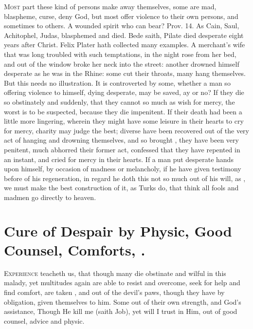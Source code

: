 {\lettrine{M}{ost} part these kind of persons make away themselves, some are
mad, blaspheme, curse, deny God, but most offer violence to their own
persons, and sometimes to others. A wounded spirit who can bear? Prov.
 14. As Cain, Saul, Achitophel, Judas, blasphemed and died. Bede
saith, Pilate died desperate eight years after Christ. Felix
Plater hath collected many examples. A merchant's wife that was
long troubled with such temptations, in the night rose from her bed,
and out of the window broke her neck into the street: another drowned
himself desperate as he was in the Rhine: some cut their throats, many
hang themselves. But this needs no illustration. It is controverted by
some, whether a man so offering violence to himself, dying desperate,
may be saved, ay or no? If they die so obstinately and suddenly, that
they cannot so much as wish for mercy, the worst is to be suspected,
because they die impenitent. If their death had been a little
more lingering, wherein they might have some leisure in their hearts to
cry for mercy, charity may judge the best; diverse have been recovered
out of the very act of hanging and drowning themselves, and so brought
, they have been very penitent, much abhorred their
former act, confessed that they have repented in an instant, and cried
for mercy in their hearts. If a man put desperate hands upon himself,
by occasion of madness or melancholy, if he have given testimony before
of his regeneration, in regard he doth this not so much out of his
will, as , we must make the best construction of it, as
Turks do, that think all fools and madmen go directly to heaven.

\section[Cure of Despair]{Cure of Despair by Physic, Good Counsel, Comforts, \etc{}.}

\lettrine{E}{xperience} teacheth us, that though many die obstinate and wilful in
this malady, yet multitudes again are able to resist and overcome, seek
for help and find comfort, are taken , and out of the devil's paws, though they have by
obligation, given themselves to him. Some out of their own
strength, and God's assistance, Though He kill me (saith Job), yet
will I trust in Him, out of good counsel, advice and physic.

}
